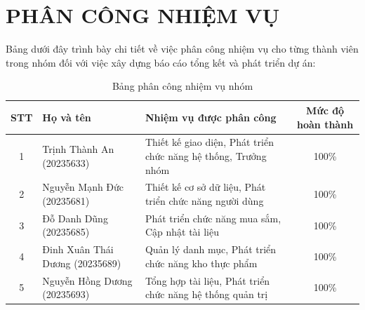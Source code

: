 \chapter*{PHÂN CÔNG NHIỆM VỤ}

Bảng dưới đây trình bày chi tiết về việc phân công nhiệm vụ cho từng thành viên trong nhóm đối với việc xây dựng báo cáo tổng kết và phát triển dự án:

\begin{table}[H]
    \centering
    \renewcommand{\arraystretch}{1.5}
    \begin{tabular}{|c|p{4cm}|p{6cm}|c|}
        \hline
        \textbf{STT} & \textbf{Họ và tên} & \textbf{Nhiệm vụ được phân công} & \textbf{Mức độ hoàn thành} \\
        \hline
        1 & Trịnh Thành An (20235633) & Thiết kế giao diện, Phát triển chức năng hệ thống, Trưởng nhóm & 100\% \\
        \hline
        2 & Nguyễn Mạnh Đức (20235681) & Thiết kế cơ sở dữ liệu, Phát triển chức năng người dùng & 100\% \\
        \hline
        3 & Đỗ Danh Dũng (20235685) & Phát triển chức năng mua sắm, Cập nhật tài liệu & 100\% \\
        \hline
        4 & Đinh Xuân Thái Dương (20235689) & Quản lý danh mục, Phát triển chức năng kho thực phẩm & 100\% \\
        \hline
        5 & Nguyễn Hồng Dương (20235693) & Tổng hợp tài liệu, Phát triển chức năng hệ thống quản trị & 100\% \\
        \hline
    \end{tabular}
    \caption{Bảng phân công nhiệm vụ nhóm}
    \label{tab:phan_cong_nhiem_vu}
\end{table}
